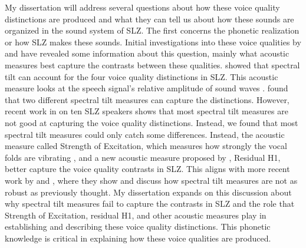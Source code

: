 \documentclass[12pt, letterpaper]{article}
\begin{document}
My dissertation will address several questions about how these voice quality distinctions are produced and what they can tell us about how these sounds are organized in the sound system of SLZ. The first concerns the phonetic realization or how SLZ makes these sounds. Initial investigations into these voice qualities by \citet{adlerAcousticsPhonationTypes2016} and \citet{brinkerhoffResidualH1MeasureInPreparation} have revealed some information about this question, mainly what acoustic measures best capture the contrasts between these qualities. \citet{adlerAcousticsPhonationTypes2016} showed that spectral tilt can account for the four voice quality distinctions in SLZ. This acoustic measure looks at the speech signal's relative amplitude of sound waves \citep{fischer-jorgensenPhoneticAnalysisBreathy1968}. \citeauthor{adlerAcousticsPhonationTypes2016} found that two different spectral tilt measures can capture the distinctions. However, recent work in \citet{brinkerhoffResidualH1MeasureInPreparation} on ten SLZ speakers shows that most spectral tilt measures are not good at capturing the voice quality distinctions. Instead, we found that most spectral tilt measures could only catch some differences. Instead, the acoustic measure called Strength of Excitation, which measures how strongly the vocal folds are vibrating \citep{murtyEpochExtractionSpeech2008, mittalStudyEffectsVocal2014}, and a new acoustic measure proposed by \citet{chaiH1H2Acoustic2022}, Residual H1, better capture the voice quality contrasts in SLZ. This aligns with more recent work by \citet{chaiH1H2Acoustic2022} and \citet{zhangCauseeffectRelationshipVocal2016, zhangMechanicsHumanVoice2016}, where they show and discuss how spectral tilt measures are not as robust as previously thought. My dissertation expands on this discussion about why spectral tilt measures fail to capture the contrasts in SLZ and the role that Strength of Excitation, residual H1, and other acoustic measures play in establishing and describing these voice quality distinctions. This phonetic knowledge is critical in explaining how these voice qualities are produced.
\end{document}
